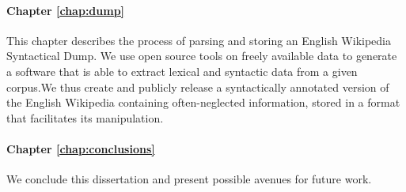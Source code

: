 \paragraph{Chapter \ref{chap:dump}} This chapter describes the process of parsing and storing an English Wikipedia Syntactical Dump. We use open source tools on freely available data to generate a software that is able to extract lexical and syntactic data from a given corpus.We thus create and publicly release a syntactically annotated version of the English Wikipedia containing often-neglected information, stored in a format that facilitates its manipulation. 

\paragraph{Chapter \ref{chap:conclusions}} We conclude this dissertation and present possible avenues for future work.

